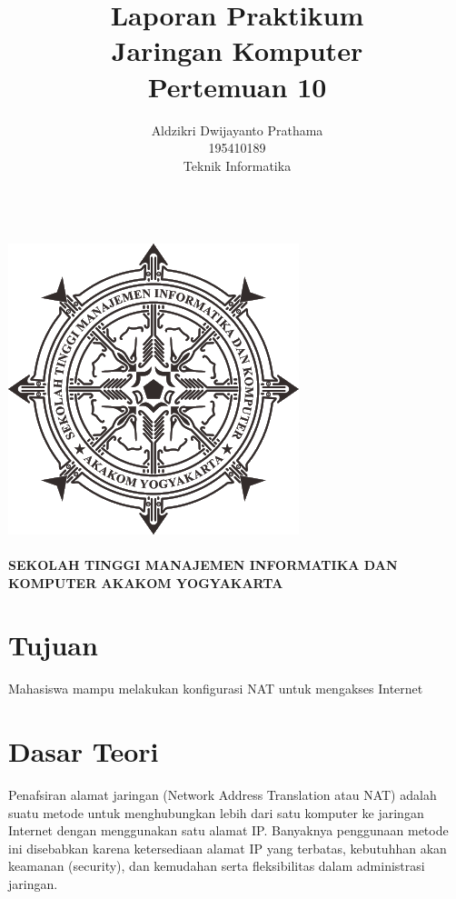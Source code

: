 \documentclass[a4paper,12pt]{article}
\begin{document}
\title{ {\Large Laporan Praktikum}\\ Jaringan Komputer \\{\Large Pertemuan 10}}

\author{Aldzikri Dwijayanto Prathama 
	\\195410189
	\\Teknik Informatika}
\makeatletter
\begin{titlepage}
	\begin{center}
		{\huge \bfseries \@title }\\[14ex]
		\includegraphics[scale=.8]{logo}\\[4ex]
		{\large \@author}\\[19ex]
		{\large \bfseries {SEKOLAH TINGGI MANAJEMEN INFORMATIKA DAN KOMPUTER
				AKAKOM YOGYAKARTA}}
	\end{center}


{\large \@date} 
\end{titlepage}
\makeatother
\newpage
\tableofcontents
\newpage

\section{Tujuan}
Mahasiswa mampu melakukan konfigurasi NAT untuk mengakses Internet

\section{Dasar Teori}
Penafsiran alamat jaringan (Network Address Translation atau NAT) adalah suatu
metode untuk menghubungkan lebih dari satu komputer ke jaringan Internet dengan
menggunakan satu alamat IP. Banyaknya penggunaan metode ini disebabkan karena
ketersediaan alamat IP yang terbatas, kebutuhhan akan keamanan (security), dan
kemudahan serta fleksibilitas dalam administrasi jaringan.
\end{document}
